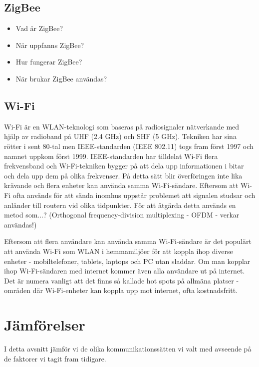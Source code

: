 \documentclass[11pt]{article}
\begin{document}
\begin{flushleft}
\subsection{ZigBee}
\begin{itemize}
\item Vad är ZigBee? 
\item När uppfanns ZigBee?
\item Hur fungerar ZigBee?
\item När brukar ZigBee användas?
\end{itemize}

\subsection{Wi-Fi}
Wi-Fi är en WLAN-teknologi som baseras på radiosignaler nätverkande med hjälp av radioband på UHF (2.4 GHz) och SHF (5 GHz). Tekniken har sina rötter i sent 80-tal men IEEE-standarden (IEEE 802.11) togs fram först 1997 och namnet uppkom först 1999. IEEE-standarden har tilldelat Wi-Fi flera frekvensband och Wi-Fi-tekniken bygger på att dela upp informationen i bitar och dela upp dem på olika frekvenser. På detta sätt blir överföringen inte lika krävande och flera enheter kan använda samma Wi-Fi-sändare. Eftersom att Wi-Fi ofta används för att sända inomhus uppstår problemet att signalen studsar och anländer till routern vid olika tidpunkter. \autocite{wifi_eb} För att åtgärda detta används en metod som...? (Orthogonal frequency-division multiplexing - OFDM -  verkar användas!)\\\bigskip

Eftersom att flera användare kan använda samma Wi-Fi-sändare är det populärt att använda Wi-Fi som WLAN i hemmamiljöer för att koppla ihop diverse enheter - mobiltelefoner, tablets, laptops och PC utan sladdar. Om man kopplar ihop Wi-Fi-sändaren med internet kommer även alla användare ut på internet. Det är numera vanligt att det finns så kallade hot spots på allmäna platser - områden där Wi-Fi-enheter kan koppla upp mot internet, ofta kostnadsfritt.\autocite{wifi_eb}

\section{Jämförelser} %
\label{sec:Jämförelser}
I detta avsnitt jämför vi de olika kommunikationssätten vi valt med avseende på de faktorer vi tagit fram tidigare.

\begin{comment}
For
ZigBee and Bluetooth, Baker [6] studied their strengths and
weaknesses for industrial applications, and claimed that
ZigBee over 802.15.4 protocol can meet a wider variety of real
industrial needs than Bluetooth due to its long-term battery
operation, greater useful range, flexibility in a number of
dimensions, and reliability of the mesh networking architecture.
\end{comment}


\end{flushleft}
\end{document}
